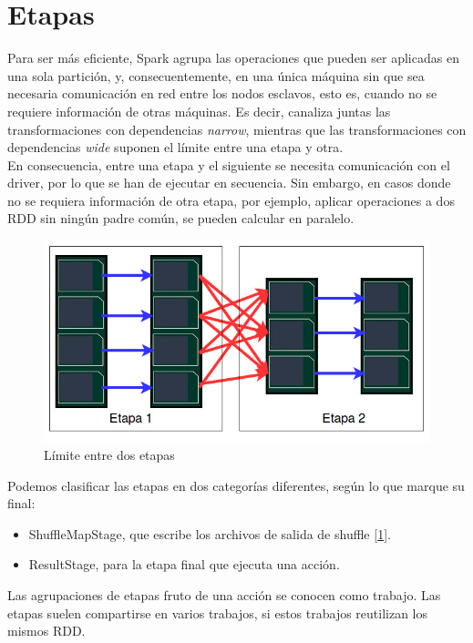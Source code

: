 \section{Etapas}
Para ser más eficiente, Spark agrupa las operaciones que pueden ser aplicadas en una sola partición, y, consecuentemente, en una única máquina sin que sea necesaria comunicación en red entre los nodos esclavos, esto es, cuando no se requiere información de otras máquinas. Es decir, canaliza juntas las transformaciones con dependencias \textit{narrow}, mientras que las transformaciones con dependencias \textit{wide} suponen el límite entre una etapa y otra.\\

En consecuencia, entre una etapa y el siguiente se necesita comunicación con el driver, por lo que se han de ejecutar en secuencia. Sin embargo, en casos donde no se requiera información de otra etapa, por ejemplo, aplicar operaciones a dos RDD sin ningún padre común, se pueden calcular en paralelo.\\

\begin{figure}[t]
	\includegraphics[scale=0.6]{img/etapas} 
	\centering
	\caption{Límite entre dos etapas}
	\label{etapas}
\end{figure}

Podemos clasificar las etapas en dos categorías diferentes, según lo que marque su final:\\

\begin{itemize}
\item ShuffleMapStage, que escribe los archivos de salida de shuffle [\ref{etapas}].
\item ResultStage, para la etapa final que ejecuta una acción.
\end{itemize}

Las agrupaciones de etapas fruto de una acción se conocen como trabajo. Las etapas suelen compartirse en varios trabajos, si estos trabajos reutilizan los mismos RDD.\\

